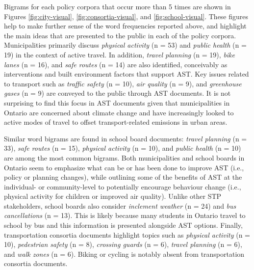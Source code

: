 \documentclass[]{elsarticle} %
\newenvironment{Shaded}{\begin{snugshade}}{\end{snugshade}}
\newcommand{\DataTypeTok}[1]{\textcolor[rgb]{0.13,0.29,0.53}{#1}}
\newcommand{\DecValTok}[1]{\textcolor[rgb]{0.00,0.00,0.81}{#1}}
\newcommand{\KeywordTok}[1]{\textcolor[rgb]{0.13,0.29,0.53}{\textbf{#1}}}
\newcommand{\NormalTok}[1]{#1}
\newcommand{\OperatorTok}[1]{\textcolor[rgb]{0.81,0.36,0.00}{\textbf{#1}}}
\newcommand{\OtherTok}[1]{\textcolor[rgb]{0.56,0.35,0.01}{#1}}
\newcommand{\StringTok}[1]{\textcolor[rgb]{0.31,0.60,0.02}{#1}}
\begin{document}
Bigrams for each policy corpora that occur more than 5 times are shown
in Figures \ref{fig:city-visual}, \ref{fig:consortia-visual}, and
\ref{fig:school-visual}. These figures help to make further sense of the
word frequencies reported above, and highlight the main ideas that are
presented to the public in each of the policy corpora. Municipalities
primarily discuss \emph{physical activity} (n = 53) and \emph{public
health} (n = 19) in the context of active travel. In addition,
\emph{travel planning} (n = 19), \emph{bike lanes} (n = 16), and
\emph{safe routes} (n = 14) are also identified, conceivably as
interventions and built environment factors that support AST. Key issues
related to transport such as \emph{traffic safety} (n = 10), \emph{air
quality} (n = 9), and \emph{greenhouse gases} (n = 9) are conveyed to
the public through AST documents. It is not surprising to find this
focus in AST documents given that municipalities in Ontario are
concerned about climate change and have increasingly looked to active
modes of travel to offset transport-related emissions in urban areas.

Similar word bigrams are found in school board documents: \emph{travel
planning} (n = 33), \emph{safe routes} (n = 15), \emph{physical
activity} (n = 10), and \emph{public health} (n = 10) are among the most
common bigrams. Both municipalities and school boards in Ontario seem to
emphasize what can be or has been done to improve AST (i.e., policy or
planning changes), while outlining some of the benefits of AST at the
individual- or community-level to potentially encourage behaviour change
(i.e., physical activity for children or improved air quality). Unlike
other STP stakeholders, school boards also consider \emph{inclement
weather} (n = 24) and \emph{bus cancellations} (n = 13). This is likely
because many students in Ontario travel to school by bus and this
information is presented alongside AST options. Finally, transportation
consortia documents highlight topics such as \emph{physical activity} (n
= 10), \emph{pedestrian safety} (n = 8), \emph{crossing guards} (n = 6),
\emph{travel planning} (n = 6), and \emph{walk zones} (n = 6). Biking or
cycling is notably absent from transportation consortia documents.

\begin{Shaded}
\end{Shaded}
\end{document}
